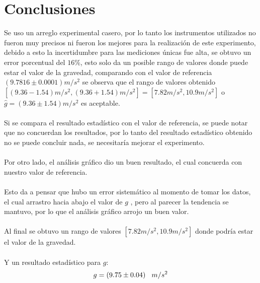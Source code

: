 \documentclass[DIV=calc, paper=a4, fontsize=11pt]{scrartcl}
\begin{document}
\section*{\textcolor{carmine}{Conclusiones}}


Se uso un arreglo experimental casero, por lo tanto los instrumentos utilizados no fueron muy precisos ni fueron los mejores para la realización de este experimento, debido a esto la incertidumbre para las mediciones únicas fue alta, se obtuvo un error porcentual del $16\%$, esto solo da un posible rango de valores donde puede estar el valor de la gravedad, comparando con el valor de referencia $(9.7816\pm0.0001)m/s^2$ se observa que el rango de valores obtenido $[(9.36-1.54) m/s^2,(9.36+1.54)m/s^2]=[7.82m/s^2,10.9m/s^2]$ o $\hat{g}=(9.36\pm 1.54) m/s^2$ es aceptable.
\\\\
Si se compara el resultado estadístico con el valor de referencia, se puede notar que no concuerdan los resultados, por lo tanto del resultado estadístico obtenido no se puede concluir nada, se necesitaría mejorar el experimento.
\\\\
Por otro lado, el análisis gráfico dio un buen resultado, el cual concuerda con nuestro valor de referencia.
\\\\
Esto da a pensar que hubo un error sistemático al momento de tomar los datos, el cual arrastro hacia abajo el valor de $g$ , pero al parecer la tendencia se mantuvo, por lo que el análisis gráfico arrojo un buen valor.
\\\\
Al final se obtuvo un rango de valores $[7.82m/s^2,10.9m/s^2]$ donde podría estar el valor de la gravedad.
\\\\
Y un resultado estadístico para $g$:
$$g = (9.75 \pm 0.04) \hspace{0.3cm} m/s^2$$

\nocite{*}


\end{document}
